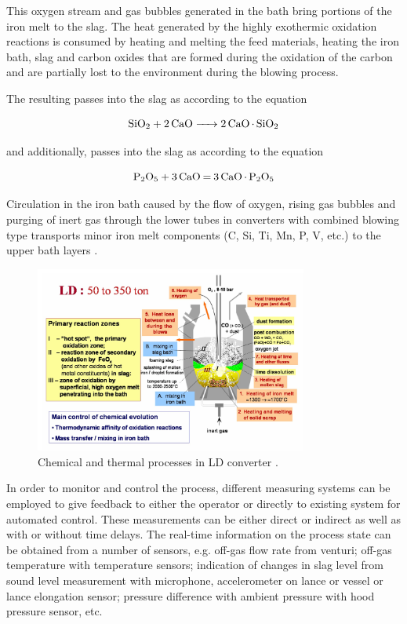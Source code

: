 This oxygen stream and gas bubbles generated in the bath bring portions of the iron melt to the slag. The heat generated by the highly exothermic oxidation reactions is consumed by heating and melting the feed materials, heating the iron bath, slag and carbon oxides that are formed during the oxidation of the carbon and are partially lost to the environment during the blowing process.

The resulting  passes into the slag as  according to the equation

\begin{equation}
	\ce{ SiO2 + 2CaO -> 2CaO.SiO2 }
\end{equation}

and additionally,  passes into the slag as  according to the equation \cite{sprava2017}

\begin{equation}
	\ce{ P2O5 + 3CaO = 3CaO.P2O5 }
\end{equation}

Circulation in the iron bath caused by the flow of oxygen, rising gas bubbles and purging of inert gas through the lower tubes in converters with combined blowing type transports minor iron melt components (C, Si, Ti, Mn, P, V, etc.) to the upper bath layers \citep{Jalkanen2006}.

\begin{figure}[!ht]
	\label{fig:ld-convertor-processes-graphical}
	\centering
	\includegraphics[width=0.8\textwidth]{figures/ld-convertor-processes-graphical.jpg}
	\caption{Chemical and thermal processes in LD converter \citep{Jalkanen2006}.}
\end{figure}

In order to monitor and control the process, different measuring systems can be employed to give feedback to either the operator or directly to existing system for automated control. These measurements can be either direct or indirect as well as with or without time delays. The real-time information on the process state can be obtained from a number of sensors, e.g. off-gas flow rate from venturi; off-gas temperature with temperature sensors; indication of changes in slag level from sound level measurement with microphone, accelerometer on lance or vessel or lance elongation sensor; pressure difference with ambient pressure with hood pressure sensor, etc.

